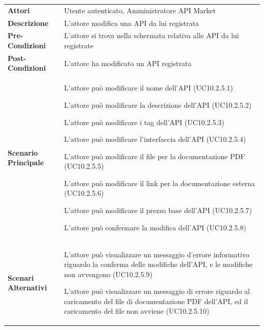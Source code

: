 \begin{minipage}{\linewidth}
	\begin{tabular}{ l | p{11cm}}
		\hline
		\rowcolor{Gray}
		\multicolumn{2}{c}{UC10.2.5 - Modifica API registrata} \\
		\hline
		\textbf{Attori} & Utente autenticato, Amministratore API Market \\
		\textbf{Descrizione} & L'attore modifica una API da lui registrata \\
		\textbf{Pre-Condizioni} & L'attore si trova nella schermata relativa alle API da lui registrate \\
		\textbf{Post-Condizioni} & L'attore ha modificato un API registrata \\
		\textbf{Scenario Principale} & 
		\begin{enumerate*}[label=(\arabic*.),itemjoin={\newline}]
			\item L'attore può modificare il nome dell'API (UC10.2.5.1)
			\item L'attore può modificare la descrizione dell'API (UC10.2.5.2)
			\item L'attore può modificare i tag dell'API (UC10.2.5.3)
			\item L'attore può modificare l'interfaccia dell'API (UC10.2.5.4)
			\item L'attore può modificare il file per la documentazione PDF (UC10.2.5.5)
			\item L'attore può modificare il link per la documentazione esterna (UC10.2.5.6)
			\item L'attore può modificare il prezzo base dell'API (UC10.2.5.7)
			\item L'attore può confermare la modifica dell'API (UC10.2.5.8)
		\end{enumerate*}\\
		\textbf{Scenari Alternativi} & 
		\begin{enumerate*}[label=(\arabic*.),itemjoin={\newline}]
			\item L'attore può visualizzare un messaggio d'errore informativo riguardo la conferma delle modifiche dell'API, e le modifiche non avvengono (UC10.2.5.9)
			\item L'attore può visualizzare un messaggio di errore riguardo al caricamento del file di documentazione PDF dell'API, ed il caricamento del file non avviene (UC10.2.5.10)
		\end{enumerate*}\\
	\end{tabular}
\end{minipage}

